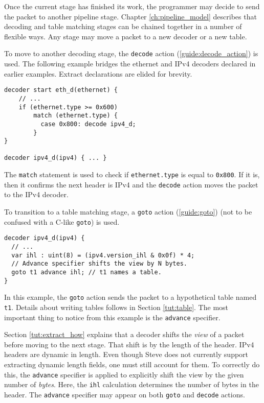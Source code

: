Once the current stage has finished its work, the programmer may decide
to send the packet to another pipeline stage.
Chapter \ref{ch:pipeline_model} describes that decoding and
table matching stages can be chained together in a number of flexible ways.
Any stage may move a packet to a new decoder or a new table.

To move to another decoding stage, the \texttt{decode} action (\ref{guide:decode_action})
is used. The following example bridges the ethernet and IPv4 decoders
declared in earlier examples. Extract declarations are elided for
brevity.

\begin{codepage}
\begin{lstlisting}
decoder start eth_d(ethernet) {
	// ...
	if (ethernet.type >= 0x600)
	    match (ethernet.type) {
	      case 0x800: decode ipv4_d;
	    }
}

decoder ipv4_d(ipv4) { ... }
\end{lstlisting}
\end{codepage}

The \texttt{match} statement is used to check if \texttt{ethernet.type} is equal to
\texttt{0x800}. If it is, then it confirms the next header is IPv4 and the \texttt{decode} action moves the packet to the IPv4 decoder.

To transition to a table matching stage, a \texttt{goto} action (\ref{guide:goto}) (not
to be confused with a C-like \texttt{goto}) is used.

\begin{codepage}
\begin{lstlisting}
decoder ipv4_d(ipv4) {
  // ...
  var ihl : uint(8) = (ipv4.version_ihl & 0x0f) * 4;
  // Advance specifier shifts the view by N bytes.
  goto t1 advance ihl; // t1 names a table.
}
\end{lstlisting}
\end{codepage}

In this example, the \texttt{goto} action sends the packet to a hypothetical table
named \texttt{t1}. Details about writing tables follows in Section \ref{tut:table}. The most important thing to notice from this example is the
\texttt{advance} specifier.

Section \ref{tut:extract_how} explains that a decoder shifts the
\textit{view} of a packet before moving to the next stage. That shift is by the
length of the header. IPv4 headers are dynamic in length. Even though Steve does not
currently support extracting dynamic length fields, one must still account for
them. To correctly do this, the \texttt{advance} specifier is applied to
explicitly shift the view by the given number of \textit{bytes}. 
Here, the \texttt{ihl} calculation determines the number of bytes in the header.
The \texttt{advance} specifier may appear on both \texttt{goto} and \texttt{decode} actions.

